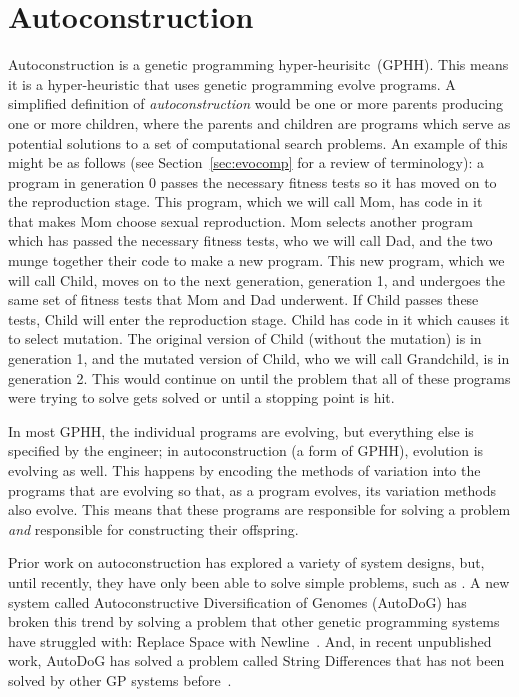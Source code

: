 \documentclass{sig-alternate}
\begin{document}
\section{Autoconstruction}
\label{sec:ac}
Autoconstruction is a genetic programming hyper-heurisitc~(GPHH). This means it is a hyper-heuristic that uses genetic programming evolve programs. A simplified definition of \textit{autoconstruction} would be one or more parents producing one or more children, where the parents and children are programs which serve as potential solutions to a set of computational search problems. An example of this might be as follows (see Section~\ref{sec:evocomp} for a review of terminology): a program in generation 0 passes the necessary fitness tests so it has moved on to the reproduction stage. This program, which we will call Mom, has code in it that makes Mom choose sexual reproduction. Mom selects another program which has passed the necessary fitness tests, who we will call Dad, and the two munge together their code to make a new program. This new program, which we will call Child, moves on to the next generation,  generation 1, and undergoes the same set of fitness tests that Mom and Dad underwent. If Child passes these tests, Child will enter the reproduction stage. Child has code in it which causes it to select mutation. The original version of Child (without the mutation) is in generation 1, and the mutated version of Child, who we will call Grandchild, is in generation 2. This would continue on until the problem that all of these programs were trying to solve gets solved or until a stopping point is hit.


In most GPHH, the individual programs are evolving, but everything else is specified by the engineer; in autoconstruction (a form of GPHH), evolution is evolving as well. This happens by encoding the methods of variation into the programs that are evolving so that, as a program evolves, its variation methods also evolve. This means that these programs are responsible for solving a problem \textit{and} responsible for constructing their offspring.

Prior work on autoconstruction has explored a variety of system designs, but, until recently, they have only been able to solve simple problems, such as . A new system called Autoconstructive Diversification of Genomes (AutoDoG) has broken this trend by solving a problem that other genetic programming systems have struggled with: Replace Space with Newline~\cite{spector:2016}. And, in recent unpublished work, AutoDoG has solved a problem called String Differences that has not been solved by other GP systems before~\cite{eva:2017}.
\end{document}
